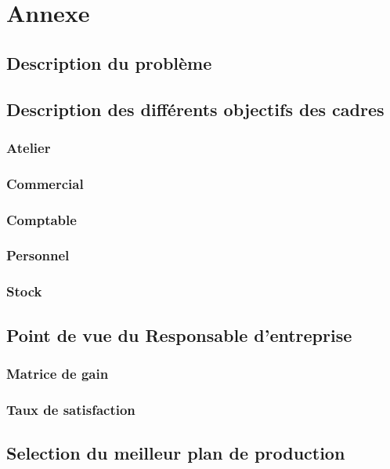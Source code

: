 \documentclass[12pt]{article}
\begin{document}
\section{Annexe}
\subsection{Description du problème}

\subsection{Description des différents objectifs des cadres}
\subsubsection{Atelier}

\subsubsection{Commercial}

\subsubsection{Comptable}

\subsubsection{Personnel}

\subsubsection{Stock}

\subsection{Point de vue du Responsable d'entreprise}
\subsubsection{Matrice de gain}

\subsubsection{Taux de satisfaction}

\subsection{Selection du meilleur plan de production}
\end{document}
